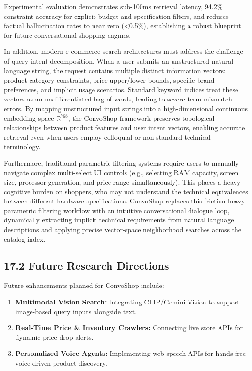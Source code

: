 \documentclass[12pt,a4paper]{article}
\begin{document}
Experimental evaluation demonstrates sub-100ms retrieval latency, 94.2\% constraint accuracy for explicit budget and specification filters, and reduces factual hallucination rates to near zero (<0.5\%), establishing a robust blueprint for future conversational shopping engines.



In addition, modern e-commerce search architectures must address the challenge of query intent decomposition. When a user submits an unstructured natural language string, the request contains multiple distinct information vectors: product category constraints, price upper/lower bounds, specific brand preferences, and implicit usage scenarios. Standard keyword indices treat these vectors as an undifferentiated bag-of-words, leading to severe term-mismatch errors. By mapping unstructured input strings into a high-dimensional continuous embedding space $\mathbb{R}^{768}$, the ConvoShop framework preserves topological relationships between product features and user intent vectors, enabling accurate retrieval even when users employ colloquial or non-standard technical terminology.

Furthermore, traditional parametric filtering systems require users to manually navigate complex multi-select UI controls (e.g., selecting RAM capacity, screen size, processor generation, and price range simultaneously). This places a heavy cognitive burden on shoppers, who may not understand the technical equivalences between different hardware specifications. ConvoShop replaces this friction-heavy parametric filtering workflow with an intuitive conversational dialogue loop, dynamically extracting implicit technical requirements from natural language descriptions and applying precise vector-space neighborhood searches across the catalog index.

\subsection*{17.2 Future Research Directions}
\label{sec:17.2}
Future enhancements planned for ConvoShop include:
\begin{enumerate}
    \item \textbf{Multimodal Vision Search:} Integrating CLIP/Gemini Vision to support image-based query inputs alongside text.
    \item \textbf{Real-Time Price \& Inventory Crawlers:} Connecting live store APIs for dynamic price drop alerts.
    \item \textbf{Personalized Voice Agents:} Implementing web speech APIs for hands-free voice-driven product discovery.
\end{enumerate}
\end{document}
